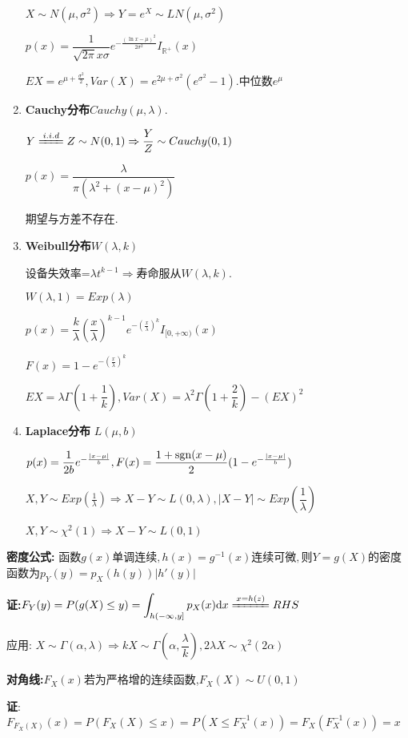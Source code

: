 \begin{enumerate}
    $ X\sim N(\mu,\sigma^2)\Rightarrow Y = e^{X}\sim LN(\mu,\sigma^2)$

    $ p(x) = \dfrac{1}{\sqrt{2\pi}x\sigma}e^{-\frac{(\ln x- \mu)^2}{2\sigma^2}}I_{\mathbb{R}^{+}}(x)$

    $ EX = e^{\mu + \frac{\sigma^2}{2}}, Var(X) = e^{2\mu+\sigma^2}(e^{\sigma^2}-1). 中位数e^\mu$

  \item \textbf{Cauchy分布}$ Cauchy(\mu, \lambda).$

    $ Y \xlongequal{i.i.d} Z \sim N(0,1) \Rightarrow \dfrac{Y}{Z}\sim Cauchy(0,1)$

    $ p(x) = \dfrac{\lambda}{\pi(\lambda^2 +(x-\mu)^2)}$

    期望与方差不存在.

  \item \textbf{Weibull分布}$ W(\lambda,k)$

    设备失效率=$ \lambda t^{k-1}\Rightarrow  寿命服从W(\lambda,k). $

    $ W(\lambda,1) = Exp(\lambda)$

    $ p(x) = \dfrac{k}{\lambda}(\dfrac{x}{\lambda})^{k-1}e^{-(\frac{x}{\lambda})^k}I_{[0,+\infty)}(x)$

      $ F(x) = 1-e^{-(\frac{x}{\lambda})^k}$

      $ EX = \lambda \Gamma(1+\dfrac{1}{k}), Var(X) = \lambda^2\Gamma(1+\dfrac{2}{k})-(EX)^2$

    \item \textbf{Laplace分布} $ L(\mu,b)$

      $ p(x)=\dfrac{1}{2b}e^{-\frac{|x-\mu|}{b}}, F(x)=\dfrac{1+\operatorname{sgn}(x-\mu)}{2}(1-e^{-\frac{|x-\mu|}{b}})$

      $ X,Y\sim Exp(\frac{1}{\lambda})\Rightarrow X-Y\sim L(0,\lambda), |X-Y|\sim Exp(\dfrac{1}{\lambda})$

      $ X,Y\sim \chi^2(1)\Rightarrow X-Y\sim L(0,1)$

\end{enumerate}

\textbf{密度公式:}
函数$g(x)单调连续,h(x) = g^{-1}(x)连续可微,则Y = g(X)$的密度函数为$ p_Y(y) = p_X(h(y))|h'(y)|$

\textbf{证:}$F_Y(y) = P(g(X)\le y)=\int_{h(-\infty,y]}{p_X(x)\mathrm{d}x} \xlongequal{x=h(z)}RHS$

应用: $X\sim \Gamma(\alpha, \lambda) \Rightarrow  kX \sim \Gamma(\alpha, \dfrac{\lambda}{k}), 2\lambda X \sim \chi^2(2\alpha)$

\textbf{对角线:}$ F_X(x)$若为严格增的连续函数,$F_X(X) \sim U(0,1)$

\textbf{证}:$ F_{F_X(X)}(x) = P(F_X(X)\le x) = P(X \le F_X^{-1}(x)) = F_X(F_X^{-1}(x)) =x$
